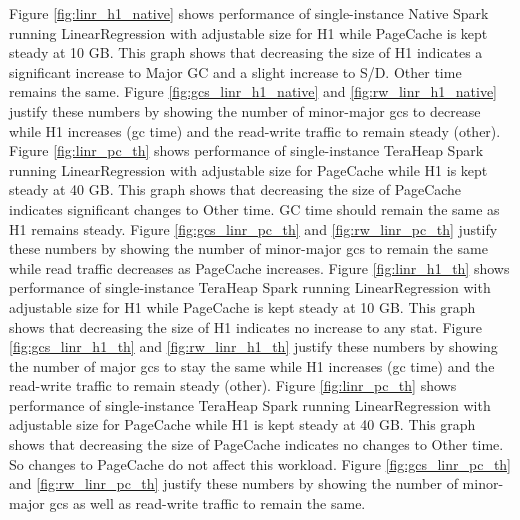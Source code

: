 \documentclass[twocolumn,10pt]{asme2e}
\begin{document}
\fi
Figure \ref{fig:linr_h1_native} shows performance of single-instance Native Spark running LinearRegression with adjustable size for H1 while PageCache is kept steady at 10 GB. This graph shows that decreasing the size of H1 indicates a significant increase to Major GC and a slight increase to S/D. Other time remains the same. Figure \ref{fig:gcs_linr_h1_native} and \ref{fig:rw_linr_h1_native} justify these numbers by showing the number of minor-major gcs to decrease while H1 increases (gc time) and the read-write traffic to remain steady (other). Figure \ref{fig:linr_pc_th} shows performance of single-instance TeraHeap Spark running LinearRegression with adjustable size for PageCache while H1 is kept steady at 40 GB. This graph shows that decreasing the size of PageCache indicates significant changes to Other time. GC time should remain the same as H1 remains steady. Figure \ref{fig:gcs_linr_pc_th} and \ref{fig:rw_linr_pc_th} justify these numbers by showing the number of minor-major gcs to remain the same while read traffic decreases as PageCache increases. Figure \ref{fig:linr_h1_th} shows performance of single-instance TeraHeap Spark running LinearRegression with adjustable size for H1 while PageCache is kept steady at 10 GB. This graph shows that decreasing the size of H1 indicates no increase to any stat. Figure \ref{fig:gcs_linr_h1_th} and \ref{fig:rw_linr_h1_th} justify these numbers by showing the number of major gcs to stay the same while H1 increases (gc time) and the read-write traffic to remain steady (other). Figure \ref{fig:linr_pc_th} shows performance of single-instance TeraHeap Spark running LinearRegression with adjustable size for PageCache while H1 is kept steady at 40 GB. This graph shows that decreasing the size of PageCache indicates no changes to Other time. So changes to PageCache do not affect this workload. Figure \ref{fig:gcs_linr_pc_th} and \ref{fig:rw_linr_pc_th} justify these numbers by showing the number of minor-major gcs as well as read-write traffic to remain the same.
\end{document}
